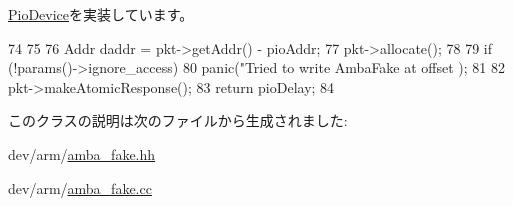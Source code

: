 \hyperlink{classPioDevice_afe8371668d023bb2516b286e5e399b6f}{PioDevice}を実装しています。


\begin{DoxyCode}
74 {
75 
76     Addr daddr = pkt->getAddr() - pioAddr;
77     pkt->allocate();
78 
79     if (!params()->ignore_access)
80         panic("Tried to write AmbaFake at offset %
      );
81 
82     pkt->makeAtomicResponse();
83     return pioDelay;
84 }
\end{DoxyCode}


このクラスの説明は次のファイルから生成されました:\begin{DoxyCompactItemize}
\item 
dev/arm/\hyperlink{amba__fake_8hh}{amba\_\-fake.hh}\item 
dev/arm/\hyperlink{amba__fake_8cc}{amba\_\-fake.cc}\end{DoxyCompactItemize}
